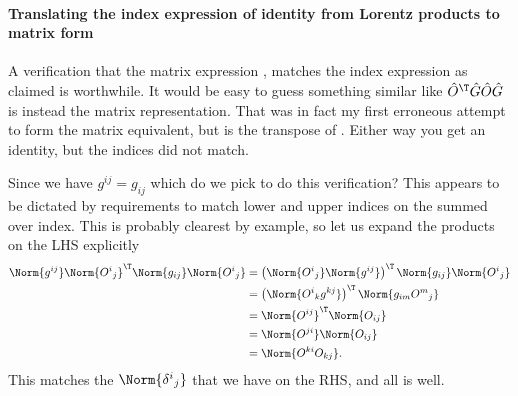 \paragraph{Translating the index expression of identity from Lorentz products to matrix form}
%
A verification that the matrix expression , matches the index expression  as claimed is worthwhile.  It would be easy to guess something similar like \(\hat{O}^\T \hat{G} \hat{O} \hat{G}\) is instead the matrix representation.  That was in fact my first erroneous attempt to form the matrix equivalent, but is the transpose of .  Either way you get an identity, but the indices did not match.

Since we have \(g^{i j} = g_{i j}\) which do we pick to do this verification?  This appears to be dictated by requirements to match lower and upper indices on the summed over index.  This is probably clearest by example, so let us expand the products on the LHS explicitly
%
\begin{equation}\label{eqn:relativisticElectrodynamicsL11b:1500}
\begin{aligned}
\Norm{ g^{i j} }
\Norm{ {O^{i}}_j } ^\T
\Norm{ g_{i j} }
\Norm{ {O^{i}}_j }
&=
\left( \Norm{ {O^{i}}_j }
\Norm{ g^{i j} } \right) ^\T
\Norm{ g_{i j} }
\Norm{ {O^{i}}_j }  \\
&=
\left( \Norm{ {O^{i}}_k g^{k j} } \right) ^\T
\Norm{ g_{i m} {O^{m}}_j }  \\
&=
\Norm{ O^{i j} } ^\T
\Norm{ O_{i j} }  \\
&=
\Norm{ O^{j i} }
\Norm{ O_{i j} }  \\
&=
\Norm{ O^{k i} O_{k j} }.
\end{aligned}
\end{equation}
%
This matches the \(\Norm{{\delta^i}_j}\) that we have on the RHS, and all is well.
